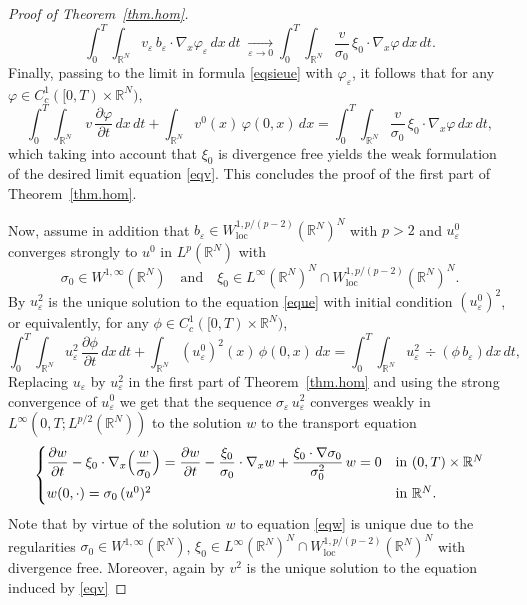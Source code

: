 \documentclass[JEP,XML,SOM,Unicode]{cedram}
\newcommand{\loc}{\mathrm{loc}}
\let \ph \varphi
\def \RR {\mathbb R}
\theoremstyle{plain}
\theoremstyle{definition}
\begin{document}
\begin{proof}[Proof of Theorem~\ref{thm.hom}]
\[
\int_0^T\!\!\int_{\RR^N}v_\varepsilon\,b_\varepsilon\cdot\nabla_x\ph_\varepsilon\,dx\,dt\;\xrightarrow[\varepsilon\to 0]\;
\int_0^T\!\!\int_{\RR^N}\dfrac{v}{\sigma_0}\,\xi_0\cdot\nabla_x\ph\,dx\,dt.
\]
Finally, passing to the limit in formula \eqref{eqsieue} with $\ph_\varepsilon$, it follows that for any $\ph\in C^1_c([0,T)\times\RR^N)$,
\[
\int_0^T\!\!\int_{\RR^N}\,v\, \dfrac{\partial\ph}{\partial t}\,dx\,dt+\int_{\RR^N}v^0(x)\,\ph(0,x)\,dx
=\int_0^T\!\!\int_{\RR^N} \dfrac{v}{\sigma_0}\,\xi_0\cdot\nabla_x\ph\,dx\,dt,
\]
which taking into account that $\xi_0$ is divergence free yields the weak formulation of the desired limit equation \eqref{eqv}.
This concludes the proof of the first part of Theorem~\ref{thm.hom}.

Now, assume in addition that $b_\varepsilon\in W^{1,p/(p-2)}_\loc(\RR^N)^N$ with $p>2$ and $u_\varepsilon^0$ converges strongly to $u^0$ in $L^p(\RR^N)$ with
\[
\sigma_0\in W^{1,\infty}(\RR^N)\quad\text{and}\quad \xi_0\in L^\infty(\RR^N)^N\cap W^{1,p/(p-2)}_\loc(\RR^N)^N.
\]
By \cite[Th.\,II.3 and Corollary\,II.1]{DiLi} $u_\varepsilon^2$ is the unique solution to the equation \eqref{eque} with initial condition $(u_\varepsilon^0)^2$, or equivalently, for any $\phi\in C^1_c([0,T)\times\RR^N)$,
\[
\int_0^T\!\!\int_{\RR^N}u_\varepsilon^2\, \dfrac{\partial\phi}{\partial t}\,dx\,dt+\int_{\RR^N}(u_\varepsilon^0)^2(x)\,\phi(0,x)\,dx=\int_0^T\!\!\int_{\RR^N}u_\varepsilon^2\,\div\left(\phi\,b_\varepsilon\right)dx\,dt,
\]
Replacing $u_\varepsilon$ by $u_\varepsilon^2$ in the first part of Theorem~\ref{thm.hom} and using the strong convergence of $u_\varepsilon^0$ we get that the sequence $\sigma_\varepsilon\,u_\varepsilon^2$ converges weakly in $L^\infty(0,T;L^{p/2}(\RR^N))$ to the solution $w$ to the transport equation
\begin{equation}\label{eqw}
\begin{cases}
\dfrac{\partial w}{\partial t}-\xi_0\cdot\nabla_x\Bigl(\dfrac{w}{\sigma_0}\Bigr)= \dfrac{\partial w}{\partial t}-\dfrac{\xi_0}{\sigma_0}\cdot\nabla_x w+ \dfrac{\xi_0\cdot\nabla\sigma_0}{\sigma_0^2}\,w=0
& \mbox{in }(0,T)\times\RR^N
\\[8pt]
w(0,\cdot)=\sigma_0\,(u^0)^2 & \mbox{in }\RR^N.
\end{cases}
\end{equation}
Note that by virtue of \cite[Cor.\,II.1]{DiLi} the solution $w$ to equation \eqref{eqw} is unique due to the regularities $\sigma_0\in W^{1,\infty}(\RR^N)$, $\xi_0\in L^\infty(\RR^N)^N\cap W^{1,p/(p-2)}_\loc(\RR^N)^N$ with divergence free. Moreover, again by \cite[Th.\,II.3 and Corollary\,II.1]{DiLi} $v^2$ is the unique solution to the equation induced by \eqref{eqv}

\end{proof}
\end{document}
